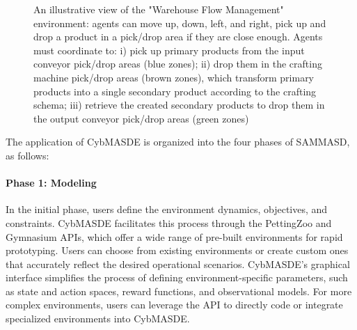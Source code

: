 \documentclass[sigconf,anonymous]{aamas}
\begin{document}


\begin{figure*}
  \centering
  
  \caption{An illustrative view of the "Warehouse Flow Management" environment: agents can move up, down, left, and right, pick up and drop a product in a pick/drop area if they are close enough. Agents must coordinate to: i) pick up primary products from the input conveyor pick/drop areas (blue zones); ii) drop them in the crafting machine pick/drop areas (brown zones), which transform primary products into a single secondary product according to the crafting schema; iii) retrieve the created secondary products to drop them in the output conveyor pick/drop areas (green zones)}
  \label{fig:warehouse}
\end{figure*}


The application of CybMASDE is organized into the four phases of SAMMASD, as follows:

\paragraph{Phase 1: Modeling}

In the initial phase, users define the environment dynamics, objectives, and constraints. CybMASDE facilitates this process through the PettingZoo and Gymnasium APIs, which offer a wide range of pre-built environments for rapid prototyping. Users can choose from existing environments or create custom ones that accurately reflect the desired operational scenarios. CybMASDE’s graphical interface simplifies the process of defining environment-specific parameters, such as state and action spaces, reward functions, and observational models. For more complex environments, users can leverage the API to directly code or integrate specialized environments into CybMASDE.
\end{document}
